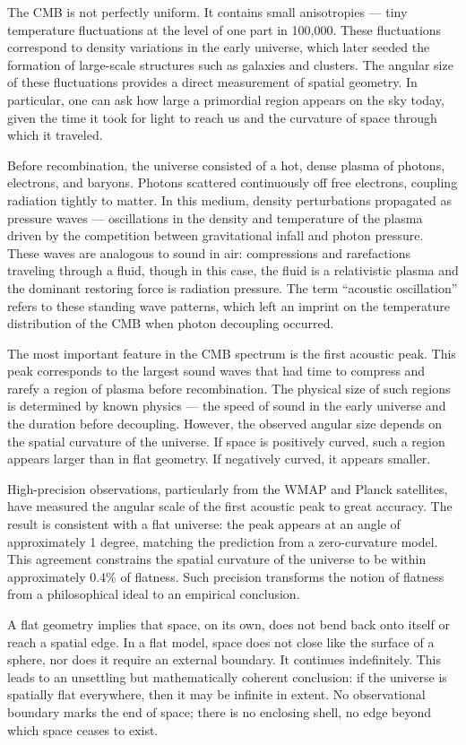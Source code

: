 The CMB is not perfectly uniform. It contains small anisotropies — tiny temperature fluctuations at the level of one part in 100,000. These fluctuations correspond to density variations in the early universe, which later seeded the formation of large-scale structures such as galaxies and clusters. The angular size of these fluctuations provides a direct measurement of spatial geometry. In particular, one can ask how large a primordial region appears on the sky today, given the time it took for light to reach us and the curvature of space through which it traveled.

Before recombination, the universe consisted of a hot, dense plasma of photons, electrons, and baryons. Photons scattered continuously off free electrons, coupling radiation tightly to matter. In this medium, density perturbations propagated as pressure waves — oscillations in the density and temperature of the plasma driven by the competition between gravitational infall and photon pressure. These waves are analogous to sound in air: compressions and rarefactions traveling through a fluid, though in this case, the fluid is a relativistic plasma and the dominant restoring force is radiation pressure. The term “acoustic oscillation” refers to these standing wave patterns, which left an imprint on the temperature distribution of the CMB when photon decoupling occurred.

The most important feature in the CMB spectrum is the first acoustic peak. This peak corresponds to the largest sound waves that had time to compress and rarefy a region of plasma before recombination. The physical size of such regions is determined by known physics — the speed of sound in the early universe and the duration before decoupling. However, the observed angular size depends on the spatial curvature of the universe. If space is positively curved, such a region appears larger than in flat geometry. If negatively curved, it appears smaller.

High-precision observations, particularly from the WMAP and Planck satellites, have measured the angular scale of the first acoustic peak to great accuracy. The result is consistent with a flat universe: the peak appears at an angle of approximately 1 degree, matching the prediction from a zero-curvature model. This agreement constrains the spatial curvature of the universe to be within approximately 0.4\% of flatness. Such precision transforms the notion of flatness from a philosophical ideal to an empirical conclusion.

A flat geometry implies that space, on its own, does not bend back onto itself or reach a spatial edge. In a flat model, space does not close like the surface of a sphere, nor does it require an external boundary. It continues indefinitely. This leads to an unsettling but mathematically coherent conclusion: if the universe is spatially flat everywhere, then it may be infinite in extent. No observational boundary marks the end of space; there is no enclosing shell, no edge beyond which space ceases to exist.


